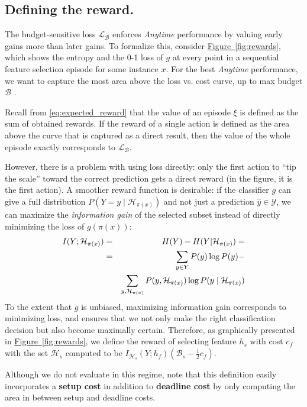 \subsection{Defining the reward.}
The budget-sensitive loss $\mathcal{L}_\mathcal{B}$ enforces \emph{Anytime} performance by valuing early gains more than later gains.
To formalize this, consider \hyperref[fig:rewards]{Figure~\ref*{fig:rewards}}, which shows the entropy and the 0-1 loss of $g$ at every point in a sequential feature selection episode for some instance $x$.
For the best \emph{Anytime} performance, we want to capture the most area above the loss vs. cost curve, up to max budget $\mathcal{B}$ \cite{Karayev-NIPS-2012}.

Recall from \eqref{eq:expected_reward} that the value of an episode $\xi$ is defined as the sum of obtained rewards.
If the reward of a single action is defined as the area above the curve that is captured as a direct result, then the value of the whole episode exactly corresponds to $\mathcal{L}_\mathcal{B}$.

However, there is a problem with using loss directly: only the first action to ``tip the scale'' toward the correct prediction gets a direct reward (in the figure, it is the first action).  A smoother reward function is desirable:
if the classifier $g$ can give a full distribution $P(Y = y \mid \mathcal{H}_{\pi(x)})$ and not just a prediction $\hat{y} \in \mathcal{Y}$, we can maximize the \emph{information gain} of the selected subset instead of directly minimizing the loss of $g(\pi(x))$:
\begin{eqnarray}
I(Y; \mathcal{H}_{\pi(x)}) &=& H(Y) - H(Y | \mathcal{H}_{\pi(x)}) = \\ \notag
&=& \sum_{y \in Y} P(y) \log P(y) -  \\ \notag
&&\sum_{y, \mathcal{H}_{\pi(x)}} P(y, \mathcal{H}_{\pi(x)}) \log P(y \mid \mathcal{H}_{\pi(x)})
\end{eqnarray}
To the extent that $g$ is unbiased, maximizing information gain corresponds to minimizing loss, and ensures that we not only make the right classification decision but also become maximally certain.
Therefore, as graphically presented in \hyperref[fig:rewards]{Figure~\ref*{fig:rewards}}, we define the reward of selecting feature $h_s$ with cost $c_f$ with the set $\mathcal{H}_s$ computed to be $I_{\mathcal{H}_s}(Y; h_f) (\mathcal{B}_s - \frac{1}{2}c_f)$.

Although we do not evaluate in this regime, note that this definition easily incorporates a \textbf{setup cost} in addition to \textbf{deadline cost} by only computing the area in between setup and deadline costs.

